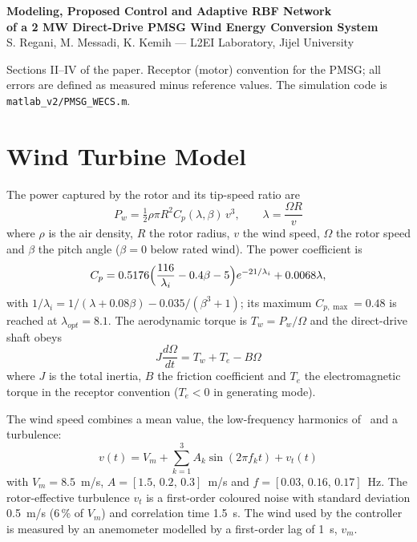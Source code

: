 \documentclass[11pt,a4paper]{article}
\begin{document}
\begin{center}
{\Large\bfseries Modeling, Proposed Control and Adaptive RBF Network\\[2pt]of a 2 MW Direct-Drive PMSG Wind Energy Conversion System}\\[6pt]
S. Regani, M. Messadi, K. Kemih --- L2EI Laboratory, Jijel University
\end{center}
\noindent Sections II--IV of the paper. Receptor (motor) convention for the PMSG; all errors are
defined as measured minus reference values. The simulation code is \texttt{matlab\_v2/PMSG\_WECS.m}.
\setcounter{section}{1}
\section{Wind Turbine Model}
The power captured by the rotor and its tip-speed ratio are~\cite{heier2014}
\begin{equation}
P_w = \tfrac{1}{2}\rho\pi R^2 C_p(\lambda,\beta)\,v^3,\qquad \lambda=\frac{\Omega R}{v}
\label{eq:pw}
\end{equation}
where $\rho$ is the air density, $R$ the rotor radius, $v$ the wind speed, $\Omega$ the rotor speed and
$\beta$ the pitch angle ($\beta=0$ below rated wind). The power coefficient is
\begin{equation}
C_p = 0.5176\Bigl(\frac{116}{\lambda_i}-0.4\beta-5\Bigr)e^{-21/\lambda_i}+0.0068\lambda,
\label{eq:cp}
\end{equation}
with $1/\lambda_i=1/(\lambda+0.08\beta)-0.035/(\beta^3+1)$; its maximum $C_{p,\max}=0.48$ is reached at
$\lambda_{opt}=8.1$. The aerodynamic torque is $T_w=P_w/\Omega$ and the direct-drive shaft obeys
\begin{equation}
J\frac{d\Omega}{dt} = T_w + T_e - B\Omega
\label{eq:shaft}
\end{equation}
where $J$ is the total inertia, $B$ the friction coefficient and $T_e$ the electromagnetic torque in the
receptor convention ($T_e<0$ in generating mode).

The wind speed combines a mean value, the low-frequency harmonics of~\cite{regani2026} and a turbulence:
\begin{equation}
v(t) = V_m + \textstyle\sum_{k=1}^{3} A_k\sin(2\pi f_k t) + v_t(t)
\label{eq:wind}
\end{equation}
with $V_m=8.5$~m/s, $A=[1.5,\,0.2,\,0.3]$~m/s and $f=[0.03,\,0.16,\,0.17]$~Hz. The rotor-effective
turbulence $v_t$ is a first-order coloured noise with standard deviation 0.5~m/s (6\,\% of $V_m$) and
correlation time 1.5~s. The wind used by the controller is measured by an anemometer modelled by a
first-order lag of 1~s, $v_m$.
\end{document}
